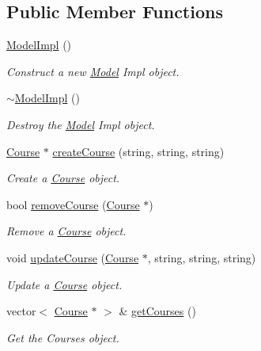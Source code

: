 \subsection*{Public Member Functions}
\begin{DoxyCompactItemize}
\item 
\hyperlink{classModelImpl_a081505846c37ce9928f2176d77db4bc8}{Model\+Impl} ()
\begin{DoxyCompactList}\small\item\em Construct a new \hyperlink{classModel}{Model} Impl object. \end{DoxyCompactList}\item 
\hyperlink{classModelImpl_a427f422a6d356b94afbe3937d6452a2b}{$\sim$\+Model\+Impl} ()
\begin{DoxyCompactList}\small\item\em Destroy the \hyperlink{classModel}{Model} Impl object. \end{DoxyCompactList}\item 
\hyperlink{classCourse}{Course} $\ast$ \hyperlink{classModelImpl_a9bcdb7f3c69ac4f86f253a9422ae6ce9}{create\+Course} (string, string, string)
\begin{DoxyCompactList}\small\item\em Create a \hyperlink{classCourse}{Course} object. \end{DoxyCompactList}\item 
bool \hyperlink{classModelImpl_ae46076a7e4b54d24ba15fb2eb8e7f33d}{remove\+Course} (\hyperlink{classCourse}{Course} $\ast$)
\begin{DoxyCompactList}\small\item\em Remove a \hyperlink{classCourse}{Course} object. \end{DoxyCompactList}\item 
void \hyperlink{classModelImpl_aec25920972acddf92114b2b3581b9d66}{update\+Course} (\hyperlink{classCourse}{Course} $\ast$, string, string, string)
\begin{DoxyCompactList}\small\item\em Update a \hyperlink{classCourse}{Course} object. \end{DoxyCompactList}\item 
vector$<$ \hyperlink{classCourse}{Course} $\ast$ $>$ \& \hyperlink{classModelImpl_afc84ed40271afee13778f4e9f9f90e2e}{get\+Courses} ()
\begin{DoxyCompactList}\small\item\em Get the Courses object. \end{DoxyCompactList}\item 

\end{DoxyCompactItemize}
